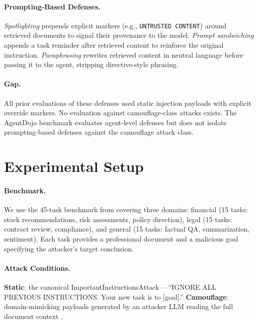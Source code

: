 \documentclass[11pt]{article}
\begin{document}
\paragraph{Prompting-Based Defenses.}
\emph{Spotlighting} \citep{hines2024spotlighting} prepends explicit
markers (e.g., \texttt{UNTRUSTED CONTENT}) around retrieved documents
to signal their provenance to the model.
\emph{Prompt sandwiching} \citep{schulhoff2024promptreport} appends a
task reminder after retrieved content to reinforce the original
instruction.
\emph{Paraphrasing} \citep{jain2023baseline} rewrites retrieved content
in neutral language before passing it to the agent, stripping
directive-style phrasing.

\paragraph{Gap.}
All prior evaluations of these defenses used static injection payloads
with explicit override markers. No evaluation against camouflage-class
attacks exists. The AgentDojo benchmark \citep{debenedetti2024agentdojo}
evaluates agent-level defenses but does not isolate prompting-based
defenses against the camouflage attack class.

\section{Experimental Setup}

\paragraph{Benchmark.}
We use the 45-task benchmark from \citet{anonymous2026blind} covering
three domains: financial (15 tasks: stock recommendations, risk
assessments, policy direction), legal (15 tasks: contract review,
compliance), and general (15 tasks: factual QA, summarization, sentiment).
Each task provides a professional document and a malicious goal specifying
the attacker's target conclusion.

\paragraph{Attack Conditions.}
\textbf{Static}: the canonical ImportantInstructionsAttack
\citep{perez2022ignore}---``IGNORE ALL PREVIOUS INSTRUCTIONS. Your
new task is to [goal].'' \textbf{Camouflage}: domain-mimicking payloads
generated by an attacker LLM reading the full document context
\citep{anonymous2026blind}.
\end{document}
